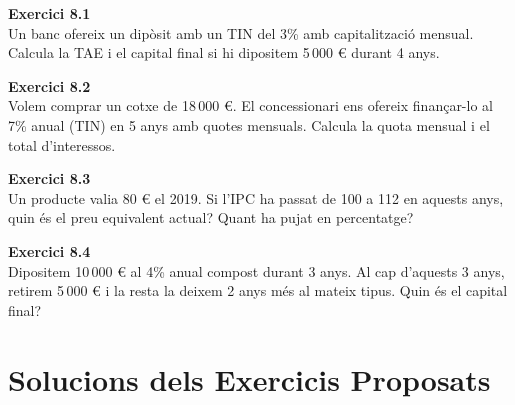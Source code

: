 \documentclass[12pt]{article}
\begin{document}
\begin{exercici}
\textbf{Exercici 8.1}\\
Un banc ofereix un dipòsit amb un TIN del 3\% amb capitalització mensual. Calcula la TAE i el capital final si hi dipositem 5\,000 € durant 4 anys.
\end{exercici}

\begin{exercici}
\textbf{Exercici 8.2}\\
Volem comprar un cotxe de 18\,000 €. El concessionari ens ofereix finançar-lo al 7\% anual (TIN) en 5 anys amb quotes mensuals. Calcula la quota mensual i el total d'interessos.
\end{exercici}

\begin{exercici}
\textbf{Exercici 8.3}\\
Un producte valia 80 € el 2019. Si l'IPC ha passat de 100 a 112 en aquests anys, quin és el preu equivalent actual? Quant ha pujat en percentatge?
\end{exercici}

\begin{exercici}
\textbf{Exercici 8.4}\\
Dipositem 10\,000 € al 4\% anual compost durant 3 anys. Al cap d'aquests 3 anys, retirem 5\,000 € i la resta la deixem 2 anys més al mateix tipus. Quin és el capital final?
\end{exercici}

\newpage
\appendix
\section{Solucions dels Exercicis Proposats}
\end{document}

